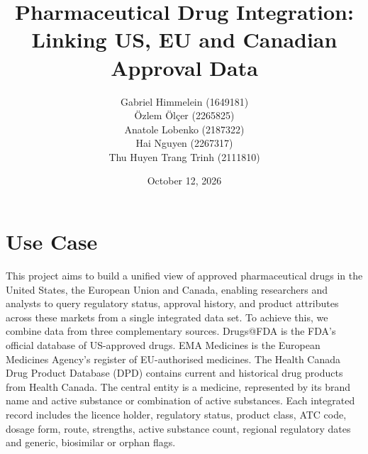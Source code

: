 \documentclass[a4paper,oneside]{scrbook}
\begin{document}
\makeatletter
\renewcommand\thesection{\arabic{section}}
\renewcommand\thesubsection{\arabic{section}.\arabic{subsection}}
\renewcommand\thesubsubsection{\arabic{section}.\arabic{subsection}.\arabic{subsubsection}}
\makeatother

\subject{Web Data Integration \\ Project Outline} 
\title{Pharmaceutical Drug Integration: Linking US, EU and Canadian Approval Data}
\author{
  Gabriel Himmelein (1649181)\\
  Özlem Ölçer (2265825)\\
  Anatole Lobenko (2187322)\\
  Hai Nguyen (2267317)\\ 
  Thu Huyen Trang Trinh (2111810)
} \date{October 12, 2026}
\publishers{{\small Submitted to}\\
  Data and Web Science Group\\
  Dr. Ralph Peeters\\
  Prof. Dr. Christian Bizer\\
  University of Mannheim\\}
\maketitle


\section{Use Case}

This project aims to build a unified view of approved pharmaceutical drugs in the United
States, the European Union and Canada, enabling researchers and analysts to query regulatory
status, approval history, and product attributes across these markets from a single integrated data set. To achieve this, we combine data from three complementary sources.
Drugs@FDA is the FDA's official database of US-approved drugs. EMA Medicines is
the European Medicines Agency's register of EU-authorised medicines. The Health
Canada Drug Product Database (DPD) contains current and historical drug products from
Health Canada. The central entity is a medicine, represented by its brand name and active
substance or combination of active substances. Each integrated record includes the licence
holder, regulatory status, product class, ATC code, dosage form, route, strengths, active
substance count, regional regulatory dates and generic, biosimilar or orphan flags.
\end{document}
